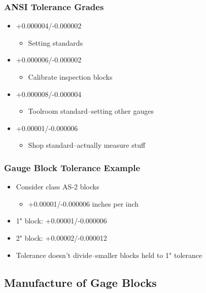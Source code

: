 \begin{frame}
	\frametitle{ANSI Tolerance Grades}

    \begin{itemize}[<+- | alert@+>]
        \item[00] +0.000004/-0.000002
            \begin{itemize}
                \item Setting standards
            \end{itemize}
        \item[0] +0.000006/-0.000002
            \begin{itemize}
                \item Calibrate inspection blocks
            \end{itemize}
        \item[AS-1] +0.000008/-0.000004
            \begin{itemize}
                \item Toolroom standard--setting other gauges
            \end{itemize}
        \item[AS-2] +0.00001/-0.000006
            \begin{itemize}
                \item Shop standard--actually measure stuff
            \end{itemize}
    \end{itemize}
\end{frame}

\begin{frame}
	\frametitle{Gauge Block Tolerance Example}

    \begin{itemize}[<+- | alert@+>]
        \item Consider class AS-2 blocks
            \begin{itemize}
                \item +0.00001/-0.000006 inches per inch
            \end{itemize}
        \item 1" block: +0.00001/-0.000006
        \item 2" block: +0.00002/-0.000012
        \item Tolerance doesn't divide--smaller blocks held to 1" tolerance
    \end{itemize}
\end{frame}

\subsection{Manufacture of Gage Blocks}

